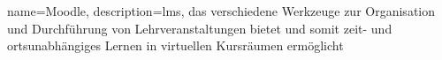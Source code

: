 {
        name=Moodle,
        description={\acrfull{lms}, das verschiedene Werkzeuge zur Organisation und Durchführung von Lehrveranstaltungen bietet und somit zeit- und ortsunabhängiges Lernen in virtuellen Kursräumen ermöglicht \cite{HsH.ELC}} %
}